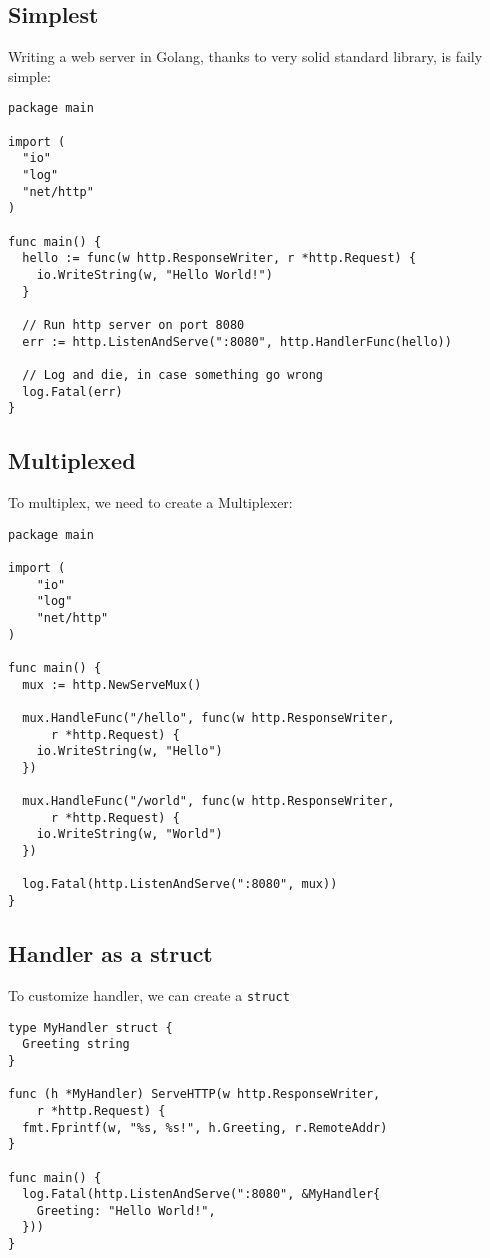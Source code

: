 \documentclass[11pt, letterpaper]{article}
\begin{document}
\subsection{Simplest}

Writing a web server in Golang, thanks to very solid standard library, is faily simple:

\begin{verbatim}
package main

import (
  "io"
  "log"
  "net/http"
)

func main() {
  hello := func(w http.ResponseWriter, r *http.Request) {
    io.WriteString(w, "Hello World!")
  }

  // Run http server on port 8080
  err := http.ListenAndServe(":8080", http.HandlerFunc(hello))

  // Log and die, in case something go wrong
  log.Fatal(err)
}
\end{verbatim}

\subsection{Multiplexed}

To multiplex, we need to create a Multiplexer:

\begin{verbatim}
package main

import (
    "io"
    "log"
    "net/http"
)

func main() {
  mux := http.NewServeMux()

  mux.HandleFunc("/hello", func(w http.ResponseWriter,
      r *http.Request) {
    io.WriteString(w, "Hello")
  })
  
  mux.HandleFunc("/world", func(w http.ResponseWriter,
      r *http.Request) {
    io.WriteString(w, "World")
  })

  log.Fatal(http.ListenAndServe(":8080", mux))
}
\end{verbatim}


\subsection{Handler as a struct}

To customize handler, we can create a \verb|struct|

\begin{verbatim}
type MyHandler struct {
  Greeting string
}

func (h *MyHandler) ServeHTTP(w http.ResponseWriter,
    r *http.Request) {
  fmt.Fprintf(w, "%s, %s!", h.Greeting, r.RemoteAddr)
}

func main() {
  log.Fatal(http.ListenAndServe(":8080", &MyHandler{
    Greeting: "Hello World!",
  }))
}
\end{verbatim}
\end{document}
